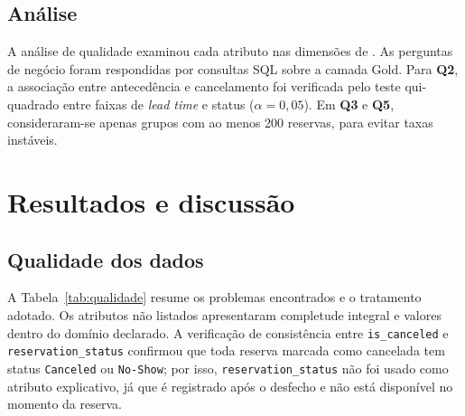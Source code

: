 \documentclass[11pt,a4paper]{article}
\newcommand{\Q}[1]{\textbf{Q#1}}
\begin{document}
\subsection{Análise}
A análise de qualidade examinou cada atributo nas dimensões de \citet{batini2006}. As perguntas de negócio foram respondidas por consultas SQL sobre a camada Gold. Para \Q{2}, a associação entre antecedência e cancelamento foi verificada pelo teste qui-quadrado entre faixas de \textit{lead time} e status ($\alpha = 0{,}05$). Em \Q{3} e \Q{5}, consideraram-se apenas grupos com ao menos 200 reservas, para evitar taxas instáveis.

\section{Resultados e discussão}\label{sec:resultados}

\subsection{Qualidade dos dados}\label{sec:qualidade}
A Tabela~\ref{tab:qualidade} resume os problemas encontrados e o tratamento adotado. Os atributos não listados apresentaram completude integral e valores dentro do domínio declarado. A verificação de consistência entre \texttt{is\_canceled} e \texttt{reservation\_status} confirmou que toda reserva marcada como cancelada tem status \texttt{Canceled} ou \texttt{No-Show}; por isso, \texttt{reservation\_status} não foi usado como atributo explicativo, já que é registrado após o desfecho e não está disponível no momento da reserva.
\end{document}
